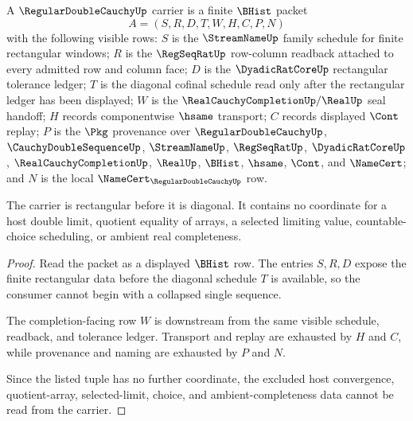 \begin{theorem}
\label{thm:regular-double-cauchy-carrier}
A $\RegularDoubleCauchyUp$ carrier is a finite $\BHist$ packet
$$
A=(S,R,D,T,W,H,C,P,N)
$$
with the following visible rows: $S$ is the $\StreamNameUp$ family schedule for finite rectangular windows; $R$ is the $\RegSeqRatUp$ row-column readback attached to every admitted row and column face; $D$ is the $\DyadicRatCoreUp$ rectangular tolerance ledger; $T$ is the diagonal cofinal schedule read only after the rectangular ledger has been displayed; $W$ is the $\RealCauchyCompletionUp/\RealUp$ seal handoff; $H$ records componentwise $\hsame$ transport; $C$ records displayed $\Cont$ replay; $P$ is the $\Pkg$ provenance over $\RegularDoubleCauchyUp$, $\CauchyDoubleSequenceUp$, $\StreamNameUp$, $\RegSeqRatUp$, $\DyadicRatCoreUp$, $\RealCauchyCompletionUp$, $\RealUp$, $\BHist$, $\hsame$, $\Cont$, and $\NameCert$; and $N$ is the local $\NameCert_{\RegularDoubleCauchyUp}$ row.

The carrier is rectangular before it is diagonal. It contains no coordinate for a host double limit, quotient equality of arrays, a selected limiting value, countable-choice scheduling, or ambient real completeness.
\end{theorem}
\begin{proof}
Read the packet as a displayed $\BHist$ row. The entries $S,R,D$ expose the finite rectangular data before the diagonal schedule $T$ is available, so the consumer cannot begin with a collapsed single sequence.

The completion-facing row $W$ is downstream from the same visible schedule, readback, and tolerance ledger. Transport and replay are exhausted by $H$ and $C$, while provenance and naming are exhausted by $P$ and $N$.

Since the listed tuple has no further coordinate, the excluded host convergence, quotient-array, selected-limit, choice, and ambient-completeness data cannot be read from the carrier.
\end{proof}


